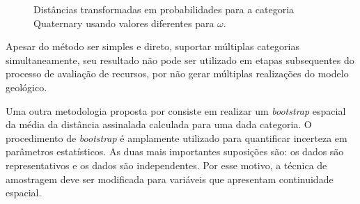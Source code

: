 \begin{figure}[H] 
    \centering
    \caption{Distâncias transformadas em probabilidades para a categoria Quaternary usando valores diferentes para $\omega$.} \label{jura_prob}
     \hspace{1em}
     \hspace{1em}
\end{figure}

Apesar do método ser simples e direto, suportar múltiplas categorias simultaneamente, seu resultado não pode ser utilizado em etapas subsequentes do processo de  avaliação de recursos, por não gerar múltiplas realizações do modelo geológico.


Uma outra metodologia proposta por  consiste em realizar um \textit{bootstrap} espacial \cite{deutsh_spatial_bootstrap} da média da distância assinalada calculada para uma dada categoria. O procedimento de \textit{bootstrap} é amplamente utilizado para quantificar incerteza em parâmetros estatísticos. As duas mais importantes suposições são: os dados são representativos e os dados são independentes. Por esse motivo, a técnica de amostragem deve ser modificada para variáveis que apresentam continuidade espacial. 

